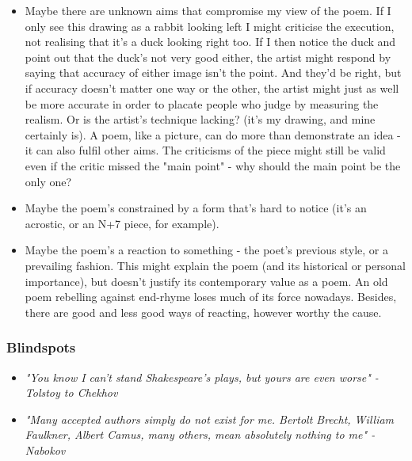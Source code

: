 \documentclass[11pt]{article}
\begin{document}
\begin{itemize}
\item Maybe there are unknown aims that compromise my view of the poem. If I only see this drawing as a rabbit looking left I might criticise the execution, not realising that it's a duck looking right too. If I then notice the duck and point out that the duck's not very good either, the artist might respond by saying that accuracy of either image isn't the point. And they'd be right, but if  accuracy doesn't matter one way or the other, the artist might just as well be more accurate in order to placate people who judge by measuring the realism. Or is the artist's technique lacking? (it's my drawing, and mine certainly is). A poem, like a picture, can do more than demonstrate an idea - it can also fulfil other aims. The criticisms of the piece might still be valid even if the critic missed the "main point" - why should the main point be the only one?
\item Maybe the poem's constrained by a form that's hard to notice (it's an acrostic, or an N+7 piece, for example). 

\item Maybe the poem's a reaction to something - the poet's previous style, or a prevailing fashion. This might explain the poem (and its historical or personal importance), but doesn't justify its contemporary value as a poem. An old poem rebelling against end-rhyme loses much of its force nowadays. Besides, there are good and less good ways of reacting, however worthy the cause. 

\end{itemize}

\subsubsection*{Blindspots}
\begin{itemize}
\item \textit{"You know I can't stand Shakespeare's plays, but yours are even worse" -
    Tolstoy to Chekhov}

\item \textit{"Many accepted authors simply do not exist for me. Bertolt Brecht,
    William Faulkner, Albert Camus, many others, mean absolutely nothing to
    me" - Nabokov}
\end{itemize}
\end{document}
